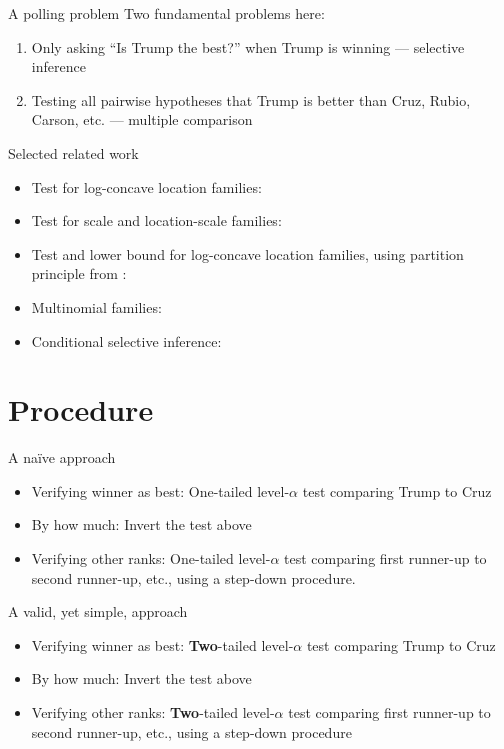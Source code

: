 \documentclass{beamer}
\begin{document}
\begin{frame}{A polling problem}
Two fundamental problems here:
\begin{enumerate}
	\item Only asking ``Is Trump the best?'' when Trump is winning --- selective inference
	\item Testing all pairwise hypotheses that Trump is better than Cruz, Rubio, Carson, etc. --- multiple comparison
\end{enumerate}
\end{frame}

\begin{frame}{Selected related work}
\begin{itemize}
\item Test for log-concave location families: \citet{Gutmann:1987fk}
\item Test for scale and location-scale families: \citet{Bofinger:1991hv,Maymin:1992fz,Karnnan:2009iv}
\item Test and lower bound for log-concave location families, using partition principle from \citet{Finner:2002ju}: \citet{Stefansson:1988wj}
\item Multinomial families: \citet{Gupta:1967wg}
\item Conditional selective inference: \citet{Fithian:2014ws}
\end{itemize}
\end{frame}

\section{Procedure}

\begin{frame}{A na\"ive approach}
\begin{itemize}
\item Verifying winner as best: One-tailed level-$\alpha$ test comparing Trump to Cruz
\item By how much: Invert the test above
\item Verifying other ranks: One-tailed level-$\alpha$ test comparing first runner-up to second runner-up, etc., using a step-down procedure.
\end{itemize}
\end{frame}

\begin{frame}{A valid, yet simple, approach}
\begin{itemize}
\item Verifying winner as best: {\bf Two}-tailed level-$\alpha$ test comparing Trump to Cruz
\item By how much: Invert the test above
\item Verifying other ranks: {\bf Two}-tailed level-$\alpha$ test comparing first runner-up to second runner-up, etc., using a step-down procedure
\end{itemize}
\end{frame}
\end{document}
